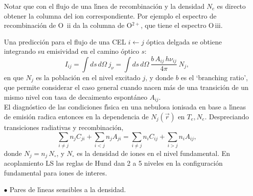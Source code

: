 Notar que con el flujo de una l\'{\i}nea de recombinaci\'on y la
densidad $N_e$ es directo obtener la columna del ion
correspondiente. Por ejemplo el espectro de recombinaci\'on de O\,{\sc
ii} da la columna de O$^{2+}$, que tiene el espectro O\,{\sc iii}.



Una predicci\'on para el flujo de una CEL $i \leftarrow j$ \'optica
delgada se obtiene integrando su emisividad en el camino \'optico $s$:
\[
I_{ij} = \int ds \, d\Omega ~ j_\nu = \int ds \, d\Omega ~ \frac{b\,
A_{ij}\, h\nu_{ij}}{4\pi}~ N_j ,
\]
en que $N_j$ es la poblaci\'on en el nivel excitado $j$, y donde $b$
es el `branching ratio', que permite considerar el caso general cuando
nacen m\'as de una transici\'on de un mismo nivel con tasa de
decaimento espont\'aneo $A_{ij}$. \\


El diagn\'ostico de las condiciones f\'{\i}sica en una nebulosa
ionisada en base a l\'{\i}neas de emisi\'on radica entonces en la
dependencia de $N_j(\vec{r})$ en $T_e,N_e$. Despreciando transiciones
radiativas y recombinaci\'on,
\[
\sum_{i{\neq}j}
{n}_{j}{C}_{ji} +
\sum_{i<j}{n}_{j}{A}_{ji} = \sum_{i{\neq}j}{n}_{i}{C}_{ij}  + \sum_{i>j}{n}_{i}{A}_{ij}, 
\]
donde $N_j = n_j \, N_\circ$, y $N_\circ$ es la densidad de iones en
el nivel fundamental. En acoplamiento LS las reglas de Hund dan 2 a 5
niveles en la configuraci\'on fundamental para iones de interes.


{$\bullet$} Pares de l\'{\i}neas sensibles a la densidad.  \\


